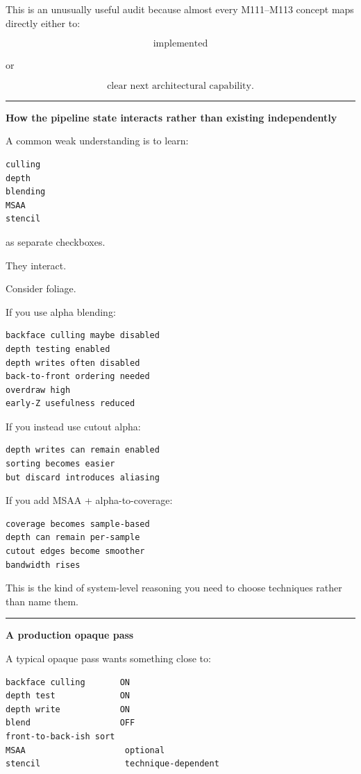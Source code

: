 This is an unusually useful audit because almost every M111--M113 concept maps directly either to:

\[
\text{implemented}
\]

or

\[
\text{clear next architectural capability}.
\]

\begin{center}\rule{0.5\linewidth}{0.5pt}\end{center}

\textbf{How the pipeline state interacts rather than existing independently}

A common weak understanding is to learn:

\begin{verbatim}
culling
depth
blending
MSAA
stencil
\end{verbatim}

as separate checkboxes.

They interact.

Consider foliage.

If you use alpha blending:

\begin{verbatim}
backface culling maybe disabled
depth testing enabled
depth writes often disabled
back-to-front ordering needed
overdraw high
early-Z usefulness reduced
\end{verbatim}

If you instead use cutout alpha:

\begin{verbatim}
depth writes can remain enabled
sorting becomes easier
but discard introduces aliasing
\end{verbatim}

If you add MSAA + alpha-to-coverage:

\begin{verbatim}
coverage becomes sample-based
depth can remain per-sample
cutout edges become smoother
bandwidth rises
\end{verbatim}

This is the kind of system-level reasoning you need to choose techniques rather than name them.

\begin{center}\rule{0.5\linewidth}{0.5pt}\end{center}

\textbf{A production opaque pass}

A typical opaque pass wants something close to:

\begin{verbatim}
backface culling       ON
depth test             ON
depth write            ON
blend                  OFF
front-to-back-ish sort
MSAA                    optional
stencil                 technique-dependent
\end{verbatim}


